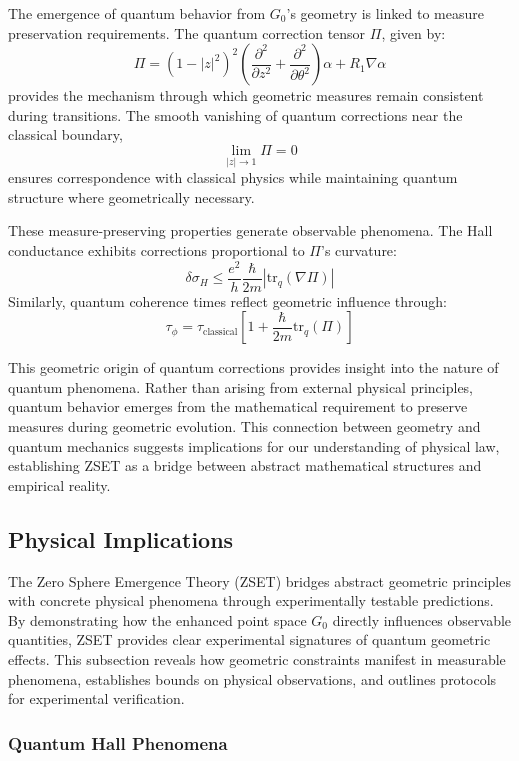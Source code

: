 \documentclass[10pt]{article}
\begin{document}
The emergence of quantum behavior from \(G_0\)'s geometry is linked to measure preservation requirements. The quantum correction tensor \(\Pi\), given by:
\[
\Pi = (1 - |z|^2)^2\left(\frac{\partial^2}{\partial z^2} + \frac{\partial^2}{\partial \theta^2}\right)\alpha + R_1\nabla\alpha
\]
provides the mechanism through which geometric measures remain consistent during transitions. The smooth vanishing of quantum corrections near the classical boundary,
\[
\lim_{|z| \to 1} \Pi = 0
\]
ensures correspondence with classical physics while maintaining quantum structure where geometrically necessary.

These measure-preserving properties generate observable phenomena. The Hall conductance exhibits corrections proportional to \(\Pi\)'s curvature:
\[
\delta\sigma_H \leq \frac{e^2}{h}\frac{\hbar}{2m}|\text{tr}_q(\nabla\Pi)|
\]
Similarly, quantum coherence times reflect geometric influence through:
\[
\tau_\phi = \tau_\text{classical}\left[1 + \frac{\hbar}{2m}\text{tr}_q(\Pi)\right]
\]

This geometric origin of quantum corrections provides insight into the nature of quantum phenomena. Rather than arising from external physical principles, quantum behavior emerges from the mathematical requirement to preserve measures during geometric evolution. This connection between geometry and quantum mechanics suggests implications for our understanding of physical law, establishing ZSET as a bridge between abstract mathematical structures and empirical reality.

\subsection{Physical Implications}

The Zero Sphere Emergence Theory (ZSET) bridges abstract geometric principles with concrete physical phenomena through experimentally testable predictions. By demonstrating how the enhanced point space \(G_0\) directly influences observable quantities, ZSET provides clear experimental signatures of quantum geometric effects. This subsection reveals how geometric constraints manifest in measurable phenomena, establishes bounds on physical observations, and outlines protocols for experimental verification.

\subsubsection{Quantum Hall Phenomena}
\end{document}
